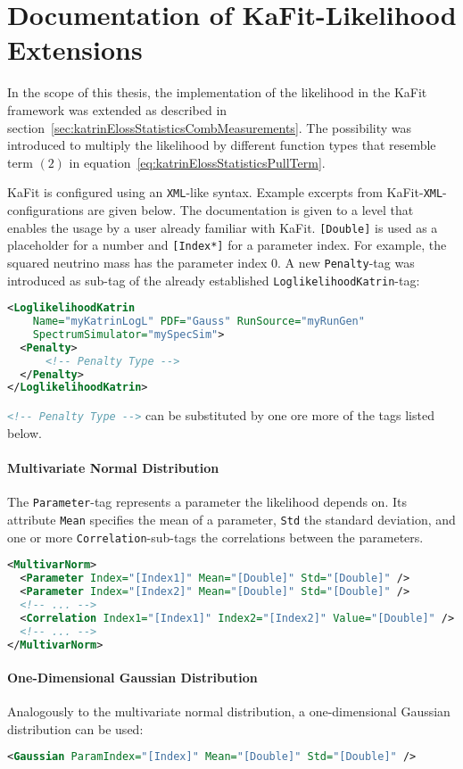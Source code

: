 \section{Documentation of KaFit-Likelihood Extensions}
\label{sec:appendixKatrinElossStatisticsLikelihoodExtKaFitConfig}
In the scope of this thesis, the implementation of the likelihood in the KaFit framework was extended as described in section~\ref{sec:katrinElossStatisticsCombMeasurements}. The possibility was introduced to multiply the likelihood by different function types that resemble term $(2)$ in equation~\eqref{eq:katrinElossStatisticsPullTerm}. 

KaFit is configured using an \texttt{XML}-like syntax. Example excerpts from KaFit-\texttt{XML}-configurations are given below. The documentation is given to a level that enables the usage by a user already familiar with KaFit. {\color{brown}\texttt{[Double]}} is used as a placeholder for a number and {\color{brown}\texttt{[Index*]}} for a parameter index. For example, the squared neutrino mass has the parameter index 0. A new \texttt{Penalty}-tag was introduced as sub-tag of the already established \texttt{LoglikelihoodKatrin}-tag:
\begin{lstlisting}[language=XML]
<LoglikelihoodKatrin 
    Name="myKatrinLogL" PDF="Gauss" RunSource="myRunGen" 
    SpectrumSimulator="mySpecSim">
  <Penalty>
      <!-- Penalty Type -->
  </Penalty>
</LoglikelihoodKatrin>
\end{lstlisting}
\lstinline[language=XML]{<!-- Penalty Type -->} can be substituted by one ore more of the tags listed below.
\paragraph{Multivariate Normal Distribution}
The {\color{violet}\texttt{Parameter}}-tag represents a parameter the likelihood depends on. Its attribute {\color{magenta}\texttt{Mean}} specifies the mean of a parameter, {\color{magenta}\texttt{Std}} the standard deviation, and one or more {\color{violet}\texttt{Correlation}}-sub-tags the correlations between the parameters.
\begin{lstlisting}[language=XML]
<MultivarNorm>
  <Parameter Index="[Index1]" Mean="[Double]" Std="[Double]" />
  <Parameter Index="[Index2]" Mean="[Double]" Std="[Double]" />
  <!-- ... -->
  <Correlation Index1="[Index1]" Index2="[Index2]" Value="[Double]" />
  <!-- ... -->
</MultivarNorm>
\end{lstlisting}

\paragraph{One-Dimensional Gaussian Distribution}
Analogously to the multivariate normal distribution, a one-dimensional Gaussian distribution can be used:
\begin{lstlisting}[language=XML]
<Gaussian ParamIndex="[Index]" Mean="[Double]" Std="[Double]" />
\end{lstlisting}

